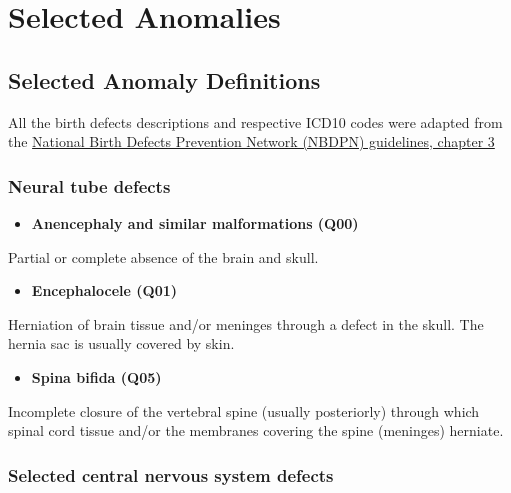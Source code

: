 \documentclass[
]{krantz}
\providecommand{\tightlist}{%
  \setlength{\itemsep}{0pt}\setlength{\parskip}{0pt}}
\begin{document}
\hypertarget{section21}{%
\section{Selected Anomalies}\label{section21}}

\hypertarget{section211}{%
\subsection{Selected Anomaly Definitions}\label{section211}}

All the birth defects descriptions and respective ICD10 codes were adapted from the \href{https://www.nbdpn.org/docs/SGSC_-_Ch3_Case_Definition_-_final_draft_2016DEC20.pdf}{National Birth Defects Prevention Network (NBDPN) guidelines, chapter 3}

\hypertarget{section2111}{%
\subsubsection{Neural tube defects}\label{section2111}}

\begin{itemize}
\tightlist
\item
  \textbf{Anencephaly and similar malformations (Q00)}
\end{itemize}

Partial or complete absence of the brain and skull.

\begin{itemize}
\tightlist
\item
  \textbf{Encephalocele (Q01)}
\end{itemize}

Herniation of brain tissue and/or meninges through a defect in the skull. The hernia sac is usually covered by skin.

\begin{itemize}
\tightlist
\item
  \textbf{Spina bifida (Q05)}
\end{itemize}

Incomplete closure of the vertebral spine (usually posteriorly) through which spinal cord tissue and/or the membranes covering the spine (meninges) herniate.

\hypertarget{section2112}{%
\subsubsection{Selected central nervous system defects}\label{section2112}}
\end{document}
